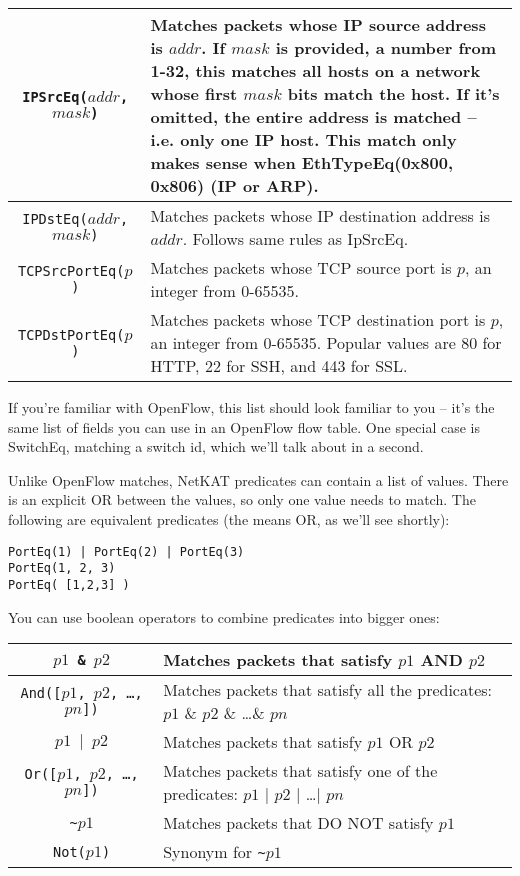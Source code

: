 \begin{tabularx}{\linewidth}{|c|X|}
\texttt{IPSrcEq($addr$, $mask$)} & Matches packets whose IP source address is $addr$.  
If $mask$ is provided, a number from 1-32, this matches all hosts on a network whose first $mask$ bits match the host.
If it's omitted, the entire address is matched -- i.e. only one IP host.  
This match only makes sense when EthTypeEq(0x800, 0x806) (IP or ARP). 
\\ \hline
\texttt{IPDstEq($addr$, $mask$)} & Matches packets whose IP destination address is $addr$.  
Follows same rules as IpSrcEq.
\\ \hline
\texttt{TCPSrcPortEq($p$)} & Matches packets whose TCP source port is $p$, an integer from 0-65535.
\\ \hline
\texttt{TCPDstPortEq($p$)} & Matches packets whose TCP destination port is $p$, an integer from 0-65535.
Popular values are 80 for HTTP, 22 for SSH, and 443 for SSL.  
\\ \hline\hline
\end{tabularx}

\bigskip
If you're familiar with OpenFlow, this list should look familiar to you -- it's the same list of fields you can 
use in an OpenFlow flow table.
One special case is SwitchEq, matching a switch id, which we'll talk about in a second.  

Unlike OpenFlow matches, NetKAT predicates can contain a list of values.  There is an explicit OR between 
the values, so only one value needs to match.  The following are equivalent predicates (the \netkat{|} means
OR, as we'll see shortly):

\begin{verbatim}
PortEq(1) | PortEq(2) | PortEq(3)
PortEq(1, 2, 3)
PortEq( [1,2,3] )
\end{verbatim}

You can use boolean operators to combine predicates into bigger ones:

\bigskip
\begin{tabularx}{\linewidth}{|c|X|}
\hline\hline
\texttt{$p1$ \& $p2$} & Matches packets that satisfy $p1$ AND $p2$
\\ \hline  
\texttt{And([$p1$, $p2$, \ldots, $pn$])} & 
Matches packets that satisfy all the predicates: $p1$ \& $p2$ \& \ldots \& $pn$
\\ \hline  
\texttt{$p1$ $\vert$ $p2$} & Matches packets that satisfy $p1$ OR $p2$
\\ \hline  
\texttt{Or([$p1$, $p2$, \ldots, $pn$])} & 
Matches packets that satisfy one of the predicates: $p1$ $\vert$ $p2$ $\vert$ \ldots $\vert$ $pn$
\\ \hline  
\texttt{\textasciitilde $p1$} & Matches packets that DO NOT satisfy $p1$
\\ \hline  
\texttt{Not($p1$)} & Synonym for \texttt{\textasciitilde $p1$}
\\ \hline\hline
\end{tabularx}

